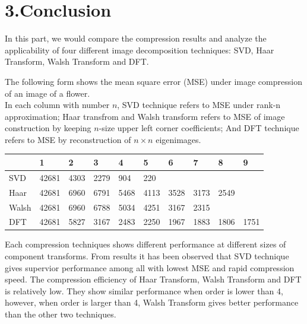 \documentclass[12pt]{article}
\begin{document}
\section*{3.\quad Conclusion}
In this part, we would compare the compression results and analyze the applicability of four different image decomposition techniques: 
SVD, Haar Transform, Walsh Transform and DFT.
\begin{flushleft}
    The following form shows the mean square error (MSE) under image compression of an image of a flower. \\
    In each column with number $n$, 
    SVD technique refers to MSE under rank-n approximation; 
    Haar transfrom and Walsh transform refers to MSE of image construction by keeping $n$-size upper left corner coefficients;
    And DFT technique refers to MSE by reconstruction of $n\times n$ eigenimages.

    \begin{table}[H]
        \centering
        \begin{tabular}{llllllllll}
            \toprule
            & 1 & 2 & 3 & 4 & 5 & 6 & 7 & 8 & 9 \\
            \midrule
            SVD & 42681 & 4303 & 2279 & 904 & 220 &  &  &  &  \\
            Haar & 42681 & 6960 & 6791 & 5468 & 4113 & 3528 & 3173 & 2549 &  \\
            Walsh & 42681 & 6960 & 6788 & 5034 & 4251 & 3167 & 2315 &  &  \\
            DFT & 42681 & 5827 & 3167 & 2483 & 2250 & 1967 & 1883 & 1806 & 1751 \\
            \bottomrule
        \end{tabular}
    \end{table}

    Each compression techniques shows different performance at different sizes of component transforms. 
    From results it has been observed that SVD technique gives supervior performance among all with lowest MSE and rapid compression speed. 
    The compression efficiency of Haar Transform, Walsh Transform and DFT is relatively low. 
    They show similar performance when order is lower than 4, however, when order is larger than 4, 
    Walsh Transform gives better performance than the other two techniques. 

\end{flushleft}
\end{document}
